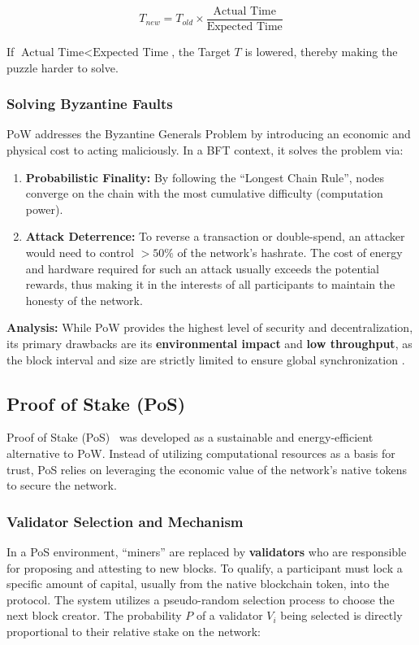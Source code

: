 \begin{equation}
    T_{new} = T_{old} \times \frac{\text{Actual Time}}{\text{Expected Time}}
\end{equation}

If $\text{Actual Time} < \text{Expected Time}$, the Target $T$ is lowered, thereby making the puzzle harder to solve.

\subsubsection{Solving Byzantine Faults}
PoW addresses the Byzantine Generals Problem by introducing an economic and physical cost to acting maliciously. In a BFT context, it solves the problem via:
\begin{enumerate}
    \item \textbf{Probabilistic Finality:} By following the \enquote{Longest Chain Rule}, nodes converge on the chain with the most cumulative difficulty (computation power). 
    \item \textbf{Attack Deterrence:} To reverse a transaction or double-spend, an attacker would need to control $>50\%$ of the network's hashrate. The cost of energy and hardware required for such an attack usually exceeds the potential rewards, thus making it in the interests of all participants to maintain the honesty of the network.
\end{enumerate}

\textbf{Analysis:} While PoW provides the highest level of security and decentralization, its primary drawbacks are its \textbf{environmental impact} and \textbf{low throughput}, as the block interval and size are strictly limited to ensure global synchronization \cite{onScalingDecentralized}.


\subsection{Proof of Stake (PoS)} \label{ch2_consensus_pos}
Proof of Stake (PoS)~\cite{blockchainWithoutWastePos} was developed as a sustainable and energy-efficient alternative to PoW. Instead of utilizing computational resources as a basis for trust, PoS relies on leveraging the economic value of the network's native tokens to secure the network.

\subsubsection{Validator Selection and Mechanism}
In a PoS environment, \enquote{miners} are replaced by \textbf{validators} who are responsible for proposing and attesting to new blocks. To qualify, a participant must lock a specific amount of capital, usually from the native blockchain token, into the protocol. The system utilizes a pseudo-random selection process to choose the next block creator. The probability $P$ of a validator $V_i$ being selected is directly proportional to their relative stake on the network:

